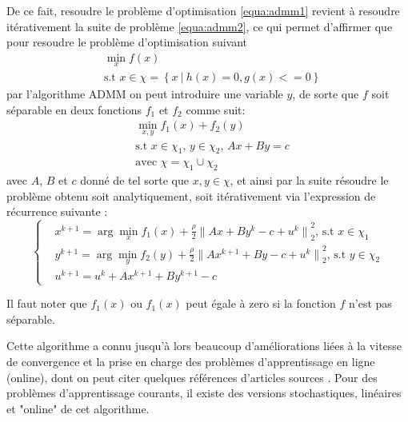 \documentclass[12pt,a4paper]{report}
\begin{document}
    	De ce fait, resoudre le problème d'optimisation \ref{equa:admm1} revient à resoudre itérativement la suite de problème \ref{equa:admm2}, ce qui permet d'affirmer que pour resoudre le problème d'optimisation suivant
    	\begin{equation*}
        	\begin{aligned}
            	& \min_{x} f(x) \\
            	& \text{s.t  $x \in \chi = \left\{x\ |\ h(x) = 0, g(x) <= 0 \right\} $}
        	\end{aligned}
    	\end{equation*}
    	par l'algorithme ADMM on peut introduire une variable $y$, de sorte que $f$ soit séparable en deux fonctions $f_1$ et $f_2$ comme suit:
    	\begin{equation*}
        	\begin{aligned}
            	& \min_{x,y} f_1(x) + f_2(y) \\
            	& \text{s.t  $x \in \chi_1$, $y \in \chi_2$, $Ax+ By = c$} \\
            	& \text{avec $\chi = \chi_1 \cup \chi_2$}
        	\end{aligned}    
    	\end{equation*}
    	avec $A$, $B$ et $c$ donné de tel sorte que $x,y \in \chi$, et ainsi par la suite résoudre le problème obtenu soit analytiquement, soit itérativement via l'expression de récurrence suivante :
    	\begin{equation*}
        	\left\{  
            	\begin{aligned}
                	& x^{k+1} = \arg\min_{x} f_1(x) + \frac{\rho}{2}{\| Ax + By^k - c + u^k\|}^2_2 \text{,  s.t $x \in \chi_1$} \\
                	& y^{k+1} = \arg\min_{y} f_2(y) + \frac{\rho}{2}{\| Ax^{k+1} + By - c + u^k\|}^2_2 \text{,  s.t $y \in \chi_2$}\\
                	& u^{k+1} = u^{k} + Ax^{k+1} + By^{k+1} - c
            	\end{aligned}
        	\right.
    	\end{equation*}
     
            Il faut noter que $f_1(x)$ ou $f_1(x)$ peut égale à zero si la fonction $f$ n'est pas séparable.
            

    	Cette algorithme a connu jusqu'à lors beaucoup d'améliorations liées à la vitesse de convergence et la prise en charge des problèmes d'apprentissage en ligne (online), dont on peut citer quelques références d'articles sources \cite{ouyang2013stochastic} \cite{wang2013online}. Pour des problèmes d'apprentissage courants, il existe des versions stochastiques, linéaires et "online" de cet algorithme.
\end{document}
